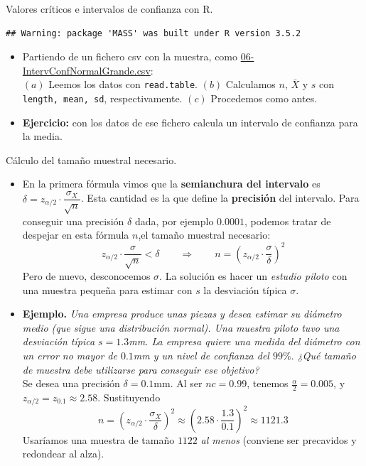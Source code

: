 \documentclass[
  9pt,
  ignorenonframetext,
]{beamer}
\newcommand{\link}[2]{\textcolor{blue}{{\href{#1}{#2}}}}
\begin{document}
\begin{frame}[fragile]{Valores críticos e intervalos de confianza con
R.}
\begin{itemize}
  \normalsize
\end{itemize}

\begin{verbatim}
## Warning: package 'MASS' was built under R version 3.5.2
\end{verbatim}

\begin{itemize}
\item
  Partiendo de un fichero csv con la muestra, como
  \link{https://raw.githubusercontent.com/fernandosansegundo/MBDFME/master/datos/06-IntervConfNormalGrande.csv}{06-IntervConfNormalGrande.csv}:\\
  \((a)\) Leemos los datos con \texttt{read.table}. \((b)\) Calculamos
  \(n\), \(\bar X\) y \(s\) con \texttt{length,\ mean,\ sd},
  respectivamente. \((c)\) Procedemos como antes.
\item
  \textbf{Ejercicio:} con los datos de ese fichero calcula un intervalo
  de confianza para la media.
\end{itemize}

\end{frame}

\begin{frame}{Cálculo del tamaño muestral necesario.}
\protect\hypertarget{calculo-del-tamano-muestral-necesario.}{}

\begin{itemize}
\item
  En la primera fórmula vimos que la \textbf{semianchura del intervalo}
  es \(\delta = z_{\alpha/2}\cdot\dfrac{\sigma_X}{\sqrt{n}}\). Esta
  cantidad es la que define la \textbf{precisión} del intervalo. Para
  conseguir una precisión \(\delta\) dada, por ejemplo \(0.0001\),
  podemos tratar de despejar en esta fórmula \(n\),el tamaño muestral
  necesario: \[ 
  z_{\alpha/2}\cdot\dfrac{\sigma}{\sqrt{n}} < \delta \qquad \Rightarrow \qquad 
  n=\left(z_{\alpha/2}\cdot\dfrac{\sigma}{\delta}\right)^2
  \] Pero de nuevo, desconocemos \(\sigma\). La solución es hacer un
  \emph{estudio piloto} con una muestra pequeña para estimar con \(s\)
  la desviación típica \(\sigma\).
\item
  \textbf{Ejemplo.} \emph{Una empresa produce unas piezas y desea
  estimar su diámetro medio (que sigue una distribución normal). Una
  muestra piloto tuvo una desviación típica \(s = 1.3\)mm. La empresa
  quiere una medida del diámetro con un error no mayor de \(0.1\)mm y un
  nivel de confianza del \(99\%.\) ¿Qué tamaño de muestra debe
  utilizarse para conseguir ese objetivo?}\\
  Se desea una precisión \(\delta=0.1\)mm. Al ser \(nc=0.99\), tenemos
  \(\frac{\alpha}{2}=0.005\), y \(z_{\alpha/2}=z_{0.1}\approx 2.58\).
  Sustituyendo \[
  n=\left(z_{\alpha/2}\cdot\dfrac{\sigma_X}{\delta}\right)^2     \approx \left(2.58\cdot\dfrac{1.3}{0.1}\right)^2\approx 1121.3
  \] Usaríamos una muestra de tamaño \(1122\) \emph{al menos} (conviene
  ser precavidos y redondear al alza).
\end{itemize}

\end{frame}
\end{document}
